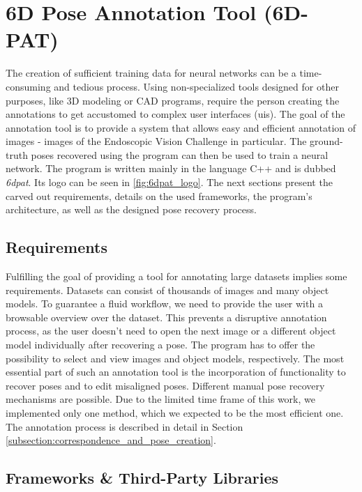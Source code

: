 \section{6D Pose Annotation Tool (6D-PAT)}

The creation of sufficient training data for neural networks can be a time-consuming and tedious process. Using non-specialized tools designed for other purposes, like 3D modeling or CAD programs, require the person creating the annotations to get accustomed to complex user interfaces (\acp{ui}). The goal of the annotation tool is to provide a system that allows easy and efficient annotation of images - images of the Endoscopic Vision Challenge in particular. The ground-truth poses recovered using the program can then be used to train a neural network. The program is written mainly in the language C++ and is dubbed \textit{\acf{6dpat}}. Its logo can be seen in \fig \ref{fig:6dpat_logo}. The next sections present the carved out requirements, details on the used frameworks, the program's architecture, as well as the designed pose recovery process.

\subsection{Requirements}

Fulfilling the goal of providing a tool for annotating large datasets implies some requirements. Datasets can consist of thousands of images and many object models. To guarantee a fluid workflow, we need to provide the user with a browsable overview over the dataset. This prevents a disruptive annotation process, as the user doesn't need to open the next image or a different object model individually after recovering a pose. The program has to offer the possibility to select and view images and object models, respectively. The most essential part of such an annotation tool is the incorporation of functionality to recover poses and to edit misaligned poses. Different manual pose recovery mechanisms are possible. Due to the limited time frame of this work, we implemented only one method, which we expected to be the most efficient one. The annotation process is described in detail in Section \ref{subsection:correspondence_and_pose_creation}.

\subsection{Frameworks \& Third-Party Libraries}

